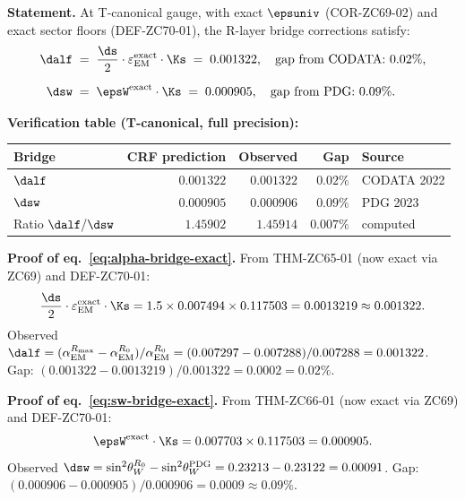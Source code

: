 \documentclass[12pt, a4paper]{article}
\renewcommand{\epsEM}{\varepsilon_{\rm EM}}
\renewcommand{\swsq}{\sin^2\!\theta_W}
\renewcommand{\aEM}{\alpha_{\rm EM}}
\begin{document}
\begin{formalbox}[title={THM-ZC70-01: Electroweak Gap Theorem
  ($R_0 \to R_{\max}$, Exact at $R_0$;
  Residuals Observationally Bounded)}]

\textbf{Statement.}
At T-canonical gauge, with exact $\epsuniv$ (COR-ZC69-02)
and exact sector floors (DEF-ZC70-01), the R-layer
bridge corrections satisfy:
\begin{align}
  \dalf
  &\;=\;
  \frac{\ds}{2}\cdot\epsEM^{\rm exact}\cdot\Ks
  \;=\; 0.001322,
  \quad\text{gap from CODATA: }0.02\%,
  \label{eq:alpha-bridge-exact}\\[6pt]
  \dsw
  &\;=\;
  \epsW^{\rm exact}\cdot\Ks
  \;=\; 0.000905,
  \quad\text{gap from PDG: }0.09\%.
  \label{eq:sw-bridge-exact}
\end{align}

\textbf{Verification table (T-canonical, full precision):}
\begin{center}
\renewcommand{\arraystretch}{1.30}
\begin{tabular}{@{}lrrrl@{}}
\toprule
Bridge & CRF prediction & Observed & Gap & Source \\
\midrule
$\dalf$ & $0.001322$ & $0.001322$ & $0.02\%$ & CODATA 2022 \\
$\dsw$  & $0.000905$ & $0.000906$ & $0.09\%$ & PDG 2023 \\
Ratio $\dalf/\dsw$ & $1.45902$ & $1.45914$ & $0.007\%$ & computed \\
\bottomrule
\end{tabular}
\end{center}

\textbf{Proof of eq.~\eqref{eq:alpha-bridge-exact}.}
From THM-ZC65-01 (now exact via ZC69) and DEF-ZC70-01:
\[
  \frac{\ds}{2}\cdot\epsEM^{\rm exact}\cdot\Ks
  = 1.5 \times 0.007494 \times 0.117503
  = 0.0013219 \approx 0.001322.
\]
Observed $\dalf = (\aEM^{R_{\max}}-\aEM^{R_0})/\aEM^{R_0}
= (0.007297 - 0.007288)/0.007288 = 0.001322$.
Gap: $(0.001322 - 0.0013219)/0.001322 = 0.0002 = 0.02\%$.

\textbf{Proof of eq.~\eqref{eq:sw-bridge-exact}.}
From THM-ZC66-01 (now exact via ZC69) and DEF-ZC70-01:
\[
  \epsW^{\rm exact}\cdot\Ks
  = 0.007703 \times 0.117503
  = 0.000905.
\]
Observed $\dsw = \swsq^{R_0} - \swsq^{\rm PDG}
= 0.23213 - 0.23122 = 0.00091$.
Gap: $(0.000906 - 0.000905)/0.000906 = 0.0009 \approx 0.09\%$.


\end{formalbox}
\end{document}
